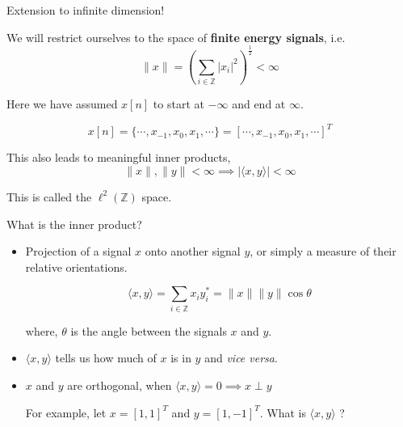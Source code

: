 \documentclass{beamer}
\begin{document}
\begin{frame}{Extension to infinite dimension!}

We will restrict ourselves to the space of \textbf{finite energy signals}, i.e.
\[ \|x\| = \left(\sum_{i \in \mathbb{Z}} \left|x_i\right| ^2\right)^{\frac{1}{2}} < \infty \]

Here we have assumed $x[n]$ to start at $-\infty$ and end at $\infty$.

\[ x[n] = \{\cdots, x_{-1}, \boxed{x_0}, x_1, \cdots\} = \left[\cdots, x_{-1}, x_0, x_1, \cdots\right]^{T} \]

This also leads to meaningful inner products, 
\[\|x\|, \|y\| < \infty \implies \left|\langle x, y\rangle\right| < \infty \]

This is called the $\ell^2\left(\mathbb{Z}\right)$ space.

\end{frame}

\begin{frame}{What is the inner product?}
\begin{itemize}
\item Projection of a signal $x$ onto another signal $y$, or simply a measure of their relative orientations.

\[ \langle x,y \rangle = \sum_{i \in \mathbb{Z}} x_iy_i^* = \|x\|\|y\|\cos \theta\]

where, $\theta$ is the angle between the signals $x$ and $y$.

\item $\langle x,y \rangle$ tells us how much of $x$ is in $y$ and \textit{vice versa}.
\item $x$ and $y$ are orthogonal, when $\langle x,y \rangle = 0 \implies x \perp y$

For example, let $x = \left[1, 1\right]^{T}$ and $y = \left[1, -1\right]^{T}$. What is  $\langle x,y  \rangle$ ?
\end{itemize}
\end{frame}
\end{document}
